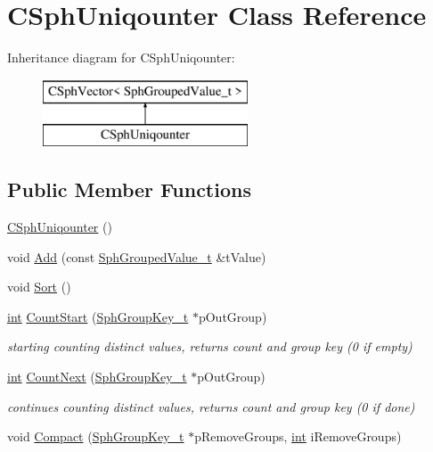 \hypertarget{classCSphUniqounter}{\section{C\-Sph\-Uniqounter Class Reference}
\label{classCSphUniqounter}
}
Inheritance diagram for C\-Sph\-Uniqounter\-:\begin{figure}[H]
\begin{center}
\leavevmode
\includegraphics[height=2.000000cm]{classCSphUniqounter}
\end{center}
\end{figure}
\subsection*{Public Member Functions}
\begin{DoxyCompactItemize}
\item 
\hyperlink{classCSphUniqounter_ae40b34085865707da59d2f5f86d86415}{C\-Sph\-Uniqounter} ()
\item 
void \hyperlink{classCSphUniqounter_aee6a828a64de677f53b4c4c8bdbf2ea2}{Add} (const \hyperlink{structSphGroupedValue__t}{Sph\-Grouped\-Value\-\_\-t} \&t\-Value)
\item 
void \hyperlink{classCSphUniqounter_ab369e67c05594537064283694302ae7a}{Sort} ()
\item 
\hyperlink{sphinxexpr_8cpp_a4a26e8f9cb8b736e0c4cbf4d16de985e}{int} \hyperlink{classCSphUniqounter_aee16a9a64ef875970c5a8599901b3c3d}{Count\-Start} (\hyperlink{sphinxsort_8cpp_ab18dbc744a7e1518a776845191f194c8}{Sph\-Group\-Key\-\_\-t} $\ast$p\-Out\-Group)
\begin{DoxyCompactList}\small\item\em starting counting distinct values, returns count and group key (0 if empty) \end{DoxyCompactList}\item 
\hyperlink{sphinxexpr_8cpp_a4a26e8f9cb8b736e0c4cbf4d16de985e}{int} \hyperlink{classCSphUniqounter_a5d5aa8712275583ea47f806f063e3a4d}{Count\-Next} (\hyperlink{sphinxsort_8cpp_ab18dbc744a7e1518a776845191f194c8}{Sph\-Group\-Key\-\_\-t} $\ast$p\-Out\-Group)
\begin{DoxyCompactList}\small\item\em continues counting distinct values, returns count and group key (0 if done) \end{DoxyCompactList}\item 
void \hyperlink{classCSphUniqounter_a4b500c225202d6649d0558b9f99c3a69}{Compact} (\hyperlink{sphinxsort_8cpp_ab18dbc744a7e1518a776845191f194c8}{Sph\-Group\-Key\-\_\-t} $\ast$p\-Remove\-Groups, \hyperlink{sphinxexpr_8cpp_a4a26e8f9cb8b736e0c4cbf4d16de985e}{int} i\-Remove\-Groups)
\end{DoxyCompactItemize}
